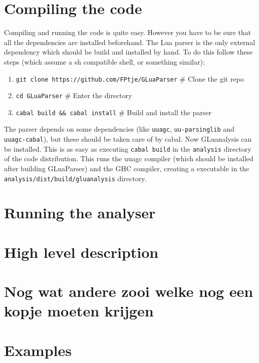 \documentclass[10pt]{article}
\begin{document}
\section{Compiling the code}
Compiling and running the code is quite easy. However you have to be sure that all the dependencies are installed beforehand. The Lua parser is the only external dependency which should be build and installed by hand. To do this follow these steps (which assume a sh compatible shell, or something similar):

\begin{enumerate}
	\item \texttt{git clone https://github.com/FPtje/GLuaParser} \# Clone the git repo
	\item \texttt{cd GLuaParser} \# Enter the directory
	\item \texttt{cabal build \&\& cabal install} \# Build and install the parser
\end{enumerate}

The parser depends on some dependencies (like \texttt{uuagc}, \texttt{uu-parsinglib} and \texttt{uuagc-cabal}), but these should be taken care of by cabal. Now GLuanalysis can be installed. This is as easy as executing \texttt{cabal build} in the \texttt{analysis} directory of the code distribution. This runs the uuagc compiler (which should be installed after building GLuaParser) and the GHC compiler, creating a executable in the \texttt{analysis/dist/build/gluanalysis} directory.

\section{Running the analyser}


\section{High level description}



\section{Nog wat andere zooi welke nog een kopje moeten krijgen}

\section{Examples}
\end{document}
